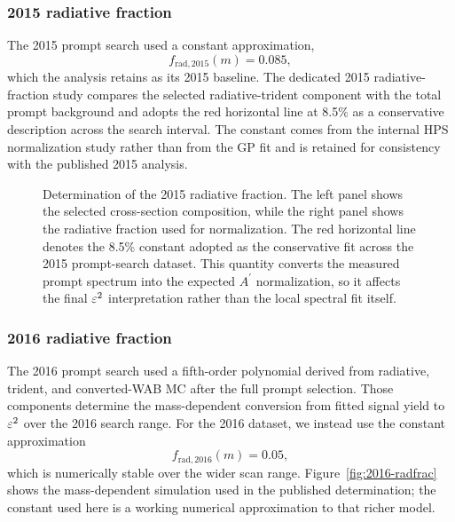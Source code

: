 \subsubsection{2015 radiative fraction}

The 2015 prompt search used a constant approximation,
\begin{equation}
f_{\mathrm{rad},2015}(m) = 0.085,
\end{equation}
which the analysis retains as its 2015 baseline. The dedicated 2015
radiative-fraction study compares the selected radiative-trident component with the
total prompt background and adopts the red horizontal line at 8.5\% as a conservative
description across the search interval. The constant comes from the internal HPS
normalization study rather than from the GP fit and is retained for consistency with
the published 2015 analysis.

\begin{figure}[H]
\centering
{}
\caption{Determination of the 2015 radiative fraction. The left panel shows the selected
cross-section composition, while the right panel shows the radiative fraction used for
normalization. The red horizontal line denotes the 8.5\% constant adopted as the
conservative fit across the 2015 prompt-search dataset. This quantity converts the
measured prompt spectrum into the expected $A^\prime$ normalization, so it affects the
final $\varepsilon^2$ interpretation rather than the local spectral fit itself.}
\label{fig:2015-radfrac}
\end{figure}

\subsubsection{2016 radiative fraction}

The 2016 prompt search used a fifth-order polynomial derived from radiative, trident,
and converted-WAB MC after the full prompt selection. Those components determine the
mass-dependent conversion from fitted signal yield to $\varepsilon^2$ over the 2016 search
range. For the 2016 dataset, we instead use the constant approximation
\begin{equation}
f_{\mathrm{rad},2016}(m) = 0.05,
\end{equation}
which is numerically stable over the wider scan range. Figure~\ref{fig:2016-radfrac}
shows the mass-dependent simulation used in the published determination; the constant
used here is a working numerical approximation to that richer model.

